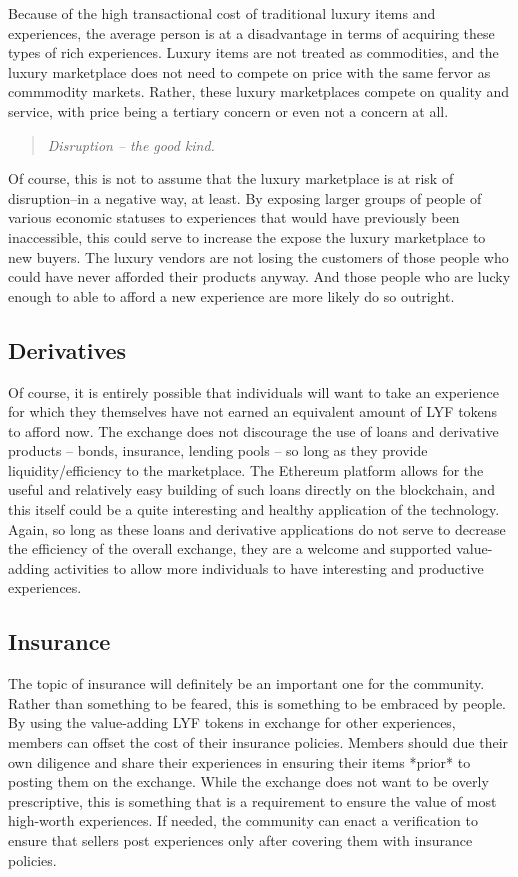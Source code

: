 \documentclass[11pt]{article}
\begin{document}
Because of the high transactional cost of traditional luxury items and experiences, the average person is at a disadvantage in terms of acquiring these types of rich experiences. Luxury items are not treated as commodities, and the luxury marketplace does not need to compete on price with the same fervor as commmodity markets. Rather, these luxury marketplaces compete on quality and service, with price being a tertiary concern or even not a concern at all.

\begin{quote}
\textit{
Disruption -- the good kind.
}
\end{quote}


Of course, this is not to assume that the luxury marketplace is at risk of disruption--in a negative way, at least. By exposing larger groups of people of various economic statuses to experiences that would have previously been inaccessible, this could serve to increase the expose the luxury marketplace to new buyers. The luxury vendors are not losing the customers of those people who could have never afforded their products anyway. And those people who are lucky enough to able to afford a new experience are more likely do so outright.


\subsection{Derivatives}
\label{sec-5-3}
Of course, it is entirely possible that individuals will want to take an experience for which they themselves have not earned an equivalent amount of LYF tokens to afford now. The exchange does not discourage the use of loans and derivative products -- bonds, insurance, lending pools -- so long as they provide liquidity/efficiency to the marketplace. The Ethereum platform allows for the useful and relatively easy building of such loans directly on the blockchain, and this itself could be a quite interesting and healthy application of the technology. Again, so long as these loans and derivative applications do not serve to decrease the efficiency of the overall exchange, they are a welcome and supported value-adding activities to allow more individuals to have interesting and productive experiences.

\subsection{Insurance}
\label{sec-5-4}
The topic of insurance will definitely be an important one for the community. Rather than something to be feared, this is something to be embraced by people. By using the value-adding LYF tokens in exchange for other experiences, members can offset the cost of their insurance policies. Members should due their own diligence and share their experiences in ensuring their items *prior* to posting them on the exchange. While the exchange does not want to be overly prescriptive, this is something that is a requirement to ensure the value of most high-worth experiences. If needed, the community can enact a verification to ensure that sellers post experiences only after covering them with insurance policies.
\end{document}
